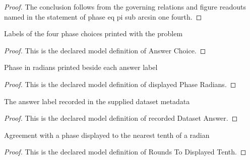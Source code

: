 \begin{proof}
  The conclusion follows from the governing relations and figure readouts named in the statement of phase eq pi sub arcsin one fourth.
\end{proof}
\begin{definition}
  \label{def:physics:phyx-mini-0302:phyxminiproblems-problemphyxmini0302-answerchoice}
  Labels of the four phase choices printed with the problem
\end{definition}
\begin{proof}
  This is the declared model definition of Answer Choice.
\end{proof}
\begin{definition}
  \label{def:physics:phyx-mini-0302:phyxminiproblems-problemphyxmini0302-displayedphaseradians}
  Phase in radians printed beside each answer label
\end{definition}
\begin{proof}
  This is the declared model definition of displayed Phase Radians.
\end{proof}
\begin{definition}
  \label{def:physics:phyx-mini-0302:phyxminiproblems-problemphyxmini0302-recordeddatasetanswer}
  The answer label recorded in the supplied dataset metadata
\end{definition}
\begin{proof}
  This is the declared model definition of recorded Dataset Answer.
\end{proof}
\begin{definition}
  \label{def:physics:phyx-mini-0302:phyxminiproblems-problemphyxmini0302-roundstodisplayedtenth}
  Agreement with a phase displayed to the nearest tenth of a radian
\end{definition}
\begin{proof}
  This is the declared model definition of Rounds To Displayed Tenth.
\end{proof}
